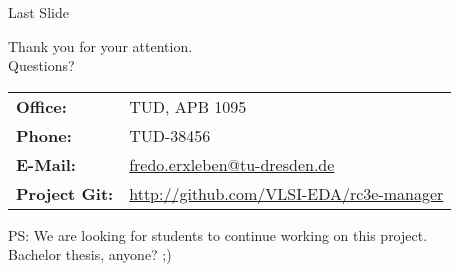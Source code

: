 \documentclass{beamer}
\begin{document}
    \begin{frame}{Last Slide}
        
        Thank you for your attention. \\
        Questions?\\
        
        \vspace{1em}
        
        \begin{tabular}{ll}
            \textbf{Office:}    & TUD, APB 1095\\
            \textbf{Phone:}     & TUD-38456 \\
            \textbf{E-Mail:}    & \href{mailto:fredo.erxleben@tu-dresden.de}{fredo.erxleben@tu-dresden.de} \\
            \textbf{Project Git:}   & \url{http://github.com/VLSI-EDA/rc3e-manager}
        \end{tabular}

        \vspace{1em}
        
        \footnotesize{PS: We are looking for students to continue working on this project.}\\
        \vspace{0.5em}
        \tiny{Bachelor thesis, anyone? ;)}
        
    \end{frame}
\end{document}
